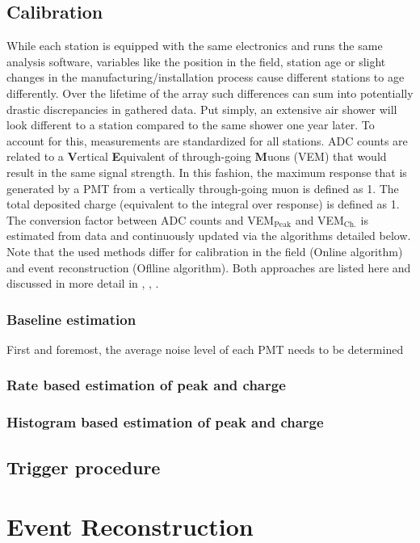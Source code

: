 \subsection{Calibration}
\label{ssec:sd-calibration}

While each station is equipped with the same electronics and runs the same analysis software, variables like the position in the field, station age or slight 
changes in the manufacturing/installation process cause different stations to age differently. Over the lifetime of the array such differences can sum into 
potentially drastic discrepancies in gathered data. Put simply, an extensive air shower will look different to a station compared to the same shower one year 
later. To account for this, measurements are standardized for all stations. ADC counts are related to a \textbf{V}ertical \textbf{E}quivalent of through-going
\textbf{M}uons (VEM) that would result in the same signal strength. In this fashion, the maximum response that is generated by a PMT from a vertically 
through-going muon is defined as \SI{1}{\Peak}. The total deposited charge (equivalent to the integral over response) is defined as \SI{1}{\Charge}. The 
conversion factor between ADC counts and VEM$_\text{Peak}$ and VEM$_\text{Ch.}$ is estimated from data and continuously updated via the algorithms detailed 
below. Note that the used methods differ for calibration in the field (Online algorithm) and event reconstruction (Oflline algorithm). Both approaches are listed
here and discussed in more detail in \cite{tobiasBaseline}, \cite{bertou2006calibration}, .

\TODO


\subsubsection{Baseline estimation}
\label{sssec:baseline-estimation}

First and foremost, the average noise level of each PMT needs to be determined

\subsubsection{Rate based estimation of peak and charge}
\label{sssec:online-calibration}


\subsubsection{Histogram based estimation of peak and charge}
\label{sssec:offline-calibration}


\subsection{Trigger procedure}
\label{ssec:sd-triggers}




\section{Event Reconstruction}
\label{sec:event-reconstruction}



